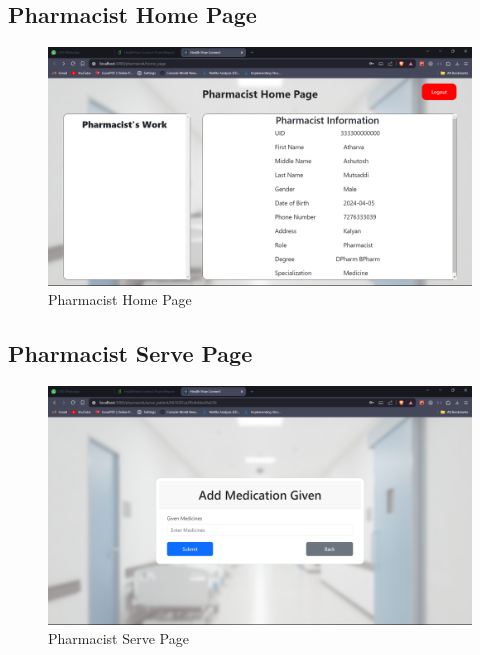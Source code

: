 \subsection{Pharmacist Home Page}
\begin{figure}[h!]
    \centering
    \includegraphics[width=\textwidth]{Pharmacist_Home_page.png}
    \caption{Pharmacist Home Page}
\end{figure}
\subsection{Pharmacist Serve Page}
\begin{figure}[h!]
    \centering
    \includegraphics[width=\textwidth]{Pharmacist_Serve_Page.png}
    \caption{Pharmacist Serve Page}
\end{figure}

\clearpage
